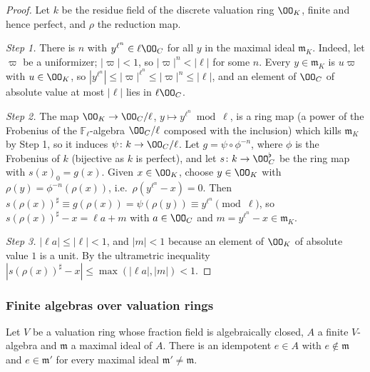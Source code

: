 \begin{proof}
Let $k$ be the residue field of the discrete valuation ring $\OO_K$, finite and hence perfect, and
$\rho$ the reduction map.

\emph{Step 1.} There is $n$ with $y^{\ell^n}\in\ell\OO_C$ for all $y$ in the maximal ideal
$\mathfrak m_K$. Indeed, let $\varpi$ be a uniformizer; $|\varpi|<1$, so $|\varpi|^n<|\ell|$ for some $n$.
Every $y\in\mathfrak m_K$ is $u\varpi$ with $u\in\OO_K$, so $|y^{\ell^n}|\le|\varpi|^{\ell^n}\le|\varpi|^n
\le|\ell|$, and an element of $\OO_C$ of absolute value at most $|\ell|$ lies in $\ell\OO_C$.

\emph{Step 2.} The map $\OO_K\to\OO_C/\ell$, $y\mapsto y^{\ell^n}\bmod\ell$, is a ring map (a power of
the Frobenius of the $\mathbb F_\ell$-algebra $\OO_C/\ell$ composed with the inclusion) which kills
$\mathfrak m_K$ by Step 1, so it induces $\psi\colon k\to\OO_C/\ell$. Let $g=\psi\circ\phi^{-n}$, where
$\phi$ is the Frobenius of $k$ (bijective as $k$ is perfect), and let $s\colon k\to\OO_C^\flat$ be the
ring map with $s(x)_0=g(x)$. Given $x\in\OO_K$, choose $y\in\OO_K$ with $\rho(y)=\phi^{-n}(\rho(x))$,
i.e.\ $\rho(y^{\ell^n}-x)=0$. Then $s(\rho(x))^\sharp\equiv g(\rho(x))=\psi(\rho(y))\equiv
y^{\ell^n}\pmod\ell$, so $s(\rho(x))^\sharp-x=\ell a+m$ with $a\in\OO_C$ and $m=y^{\ell^n}-x\in\mathfrak
m_K$.

\emph{Step 3.} $|\ell a|\le|\ell|<1$, and $|m|<1$ because an element of $\OO_K$ of absolute value $1$
is a unit. By the ultrametric inequality $|s(\rho(x))^\sharp-x|\le\max(|\ell a|,|m|)<1$.
\end{proof}

\subsubsection{Finite algebras over valuation rings}

\begin{lemma}[Idempotents]\label{lem:pf:steps2:hens}
Let $V$ be a valuation ring whose fraction field is algebraically closed, $A$ a finite $V$-algebra
and $\mathfrak m$ a maximal ideal of $A$. There is an idempotent $e\in A$ with $e\notin\mathfrak m$ and
$e\in\mathfrak m'$ for every maximal ideal $\mathfrak m'\ne\mathfrak m$.
\end{lemma}

